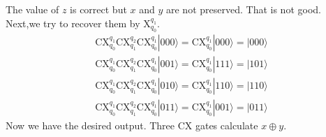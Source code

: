 \documentclass[letterpaper,10pt,english]{jupyterBook}
\begin{document}
\sphinxAtStartPar
The value of \(z\) is correct but \(x\) and \(y\) are not preserved.  That is not good. Next,we try to recover them by
X\(_{q_0}^{q_1}\).
\begin{align}
\text{CX}_{q_0}^{q_1} \text{CX}_{q_1}^{q_2}\text{CX}_{q_0}^{q_1}|000\rangle = \text{CX}_{q_0}^{q_1}|000\rangle = |000\rangle  \\
\text{CX}_{q_0}^{q_1} \text{CX}_{q_1}^{q_2}\text{CX}_{q_0}^{q_1}|001\rangle = \text{CX}_{q_0}^{q_1}|111\rangle = |101\rangle \\
\text{CX}_{q_0}^{q_1} \text{CX}_{q_1}^{q_2}\text{CX}_{q_0}^{q_1}|010\rangle = \text{CX}_{q_0}^{q_1}|110\rangle = |110\rangle \\
\text{CX}_{q_0}^{q_1} \text{CX}_{q_1}^{q_2}\text{CX}_{q_0}^{q_1}|011\rangle = \text{CX}_{q_0}^{q_1}|001\rangle =|011\rangle
\end{align}
\sphinxAtStartPar
Now we have the desired output.  Three CX gates calculate \(x \oplus y\).
\end{document}
